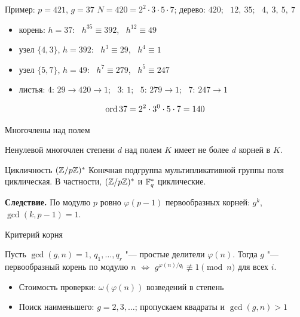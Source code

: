 \documentclass{ca-slides}
\begin{document}
\begin{canvasframe}{Пример: $p = 421$, $g = 37$}
  $N = 420 = 2^2 \cdot 3 \cdot 5 \cdot 7$; дерево: $420$; \ $12,\ 35$; \ $4,\ 3,\ 5,\ 7$
  \begin{itemize}
    \item корень: $h = 37$: \ $h^{35} \equiv 392$, \ $h^{12} \equiv 49$
    \item узел $\{4, 3\}$, $h = 392$: \ $h^{3} \equiv 29$, \ $h^{4} \equiv 1$
    \item узел $\{5, 7\}$, $h = 49$: \ $h^{7} \equiv 279$, \ $h^{5} \equiv 247$
    \item листья: $4$: $29 \to 420 \to 1$; \ $3$: $1$; \ $5$: $279 \to 1$; \ $7$: $247 \to 1$
  \end{itemize}
  \[\operatorname{ord} 37 = 2^2 \cdot 3^0 \cdot 5 \cdot 7 = 140\]
  \penspace[0.1\textheight]
\end{canvasframe}

\begin{canvasframe}{Многочлены над полем}
  \begin{lemma}
    Ненулевой многочлен степени $d$ над полем $K$ имеет не более $d$ корней в $K$.
  \end{lemma}
  \proofarea[0.25\textheight]
\end{canvasframe}

\begin{theoremframe}[theorem]{Цикличность $(\mathbb{Z}/p\mathbb{Z})^{*}$}
  Конечная подгруппа мультипликативной группы поля циклическая. В частности, $(\mathbb{Z}/p\mathbb{Z})^{*}$ и
  $\mathbb{F}_{q}^*$ циклические.

  \smallskip
  \textbf{Следствие.} По модулю $p$ ровно $\varphi(p - 1)$ первообразных корней:
  $g^k$, $\gcd(k, p - 1) = 1$.
\end{theoremframe}

\begin{canvasframe}{Критерий корня}
  \begin{theorem}
    Пусть $\gcd(g, n) = 1$, $q_1, \dots, q_r$ "--- простые делители $\varphi(n)$. Тогда $g$ "---
    первообразный корень по модулю $n$ $\iff$ $g^{\varphi(n)/q_i} \not\equiv 1 \pmod n$ для
    всех $i$.
  \end{theorem}
  \begin{itemize}
    \item Стоимость проверки: $\omega(\varphi(n))$ возведений в степень
    \item Поиск наименьшего: $g = 2, 3, \dots$; пропускаем квадраты и $\gcd(g, n) > 1$
  \end{itemize}
  \penspace[0.15\textheight]
\end{canvasframe}
\end{document}
